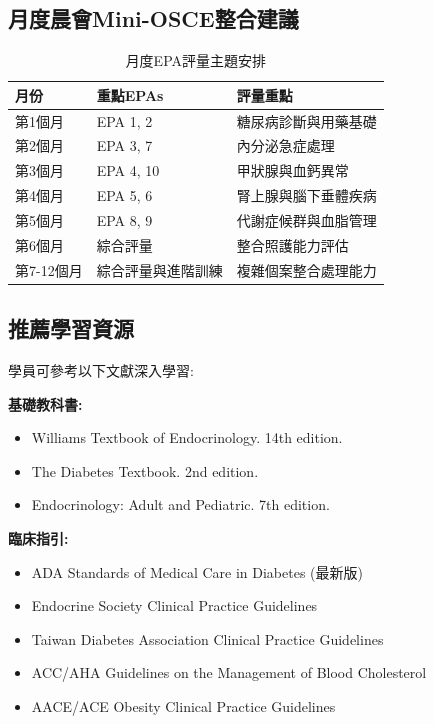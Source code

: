 \documentclass[12pt,a4paper]{article}
\begin{document}
\subsection{月度晨會Mini-OSCE整合建議}
\begin{table}[h]
    \centering
    \caption{月度EPA評量主題安排}
    \begin{tabular}{p{2.5cm} p{4.5cm} p{7cm}}
        \toprule
        \textbf{月份} & \textbf{重點EPAs} & \textbf{評量重點} \\
        \midrule
        第1個月 & EPA 1, 2 & 糖尿病診斷與用藥基礎 \\
        第2個月 & EPA 3, 7 & 內分泌急症處理 \\
        第3個月 & EPA 4, 10 & 甲狀腺與血鈣異常 \\
        第4個月 & EPA 5, 6 & 腎上腺與腦下垂體疾病 \\
        第5個月 & EPA 8, 9 & 代謝症候群與血脂管理 \\
        第6個月 & 綜合評量 & 整合照護能力評估 \\
        第7-12個月 & 綜合評量與進階訓練 & 複雜個案整合處理能力 \\
        \bottomrule
    \end{tabular}
\end{table}

\subsection{推薦學習資源}
學員可參考以下文獻深入學習:

\textbf{基礎教科書:}
\begin{itemize}
    \item Williams Textbook of Endocrinology. 14th edition.
    \item The Diabetes Textbook. 2nd edition.
    \item Endocrinology: Adult and Pediatric. 7th edition.
\end{itemize}

\textbf{臨床指引:}
\begin{itemize}
    \item ADA Standards of Medical Care in Diabetes (最新版)
    \item Endocrine Society Clinical Practice Guidelines
    \item Taiwan Diabetes Association Clinical Practice Guidelines
    \item ACC/AHA Guidelines on the Management of Blood Cholesterol
    \item AACE/ACE Obesity Clinical Practice Guidelines
\end{itemize}
\end{document}
